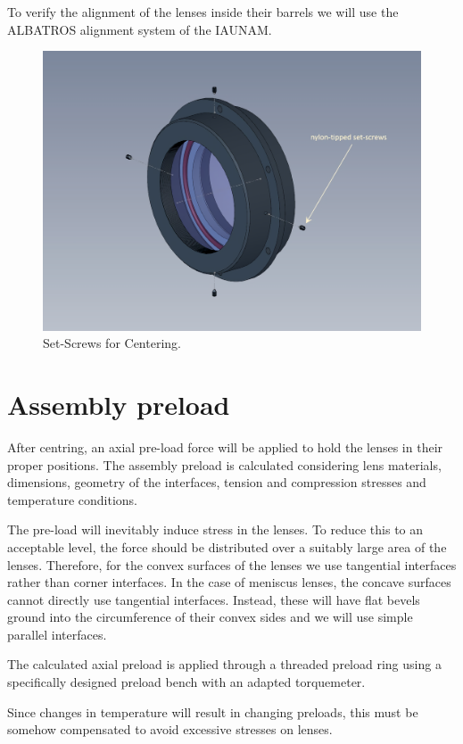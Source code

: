 \documentclass{report}
\begin{document}
To verify the alignment of the lenses inside their barrels we will use the ALBATROS alignment system of the IAUNAM.

\begin{figure}
\begin{center}
\includegraphics[width=0.7\linewidth]{figures/rosalia-set-screws.png}
\end{center}
\caption{Set-Screws for Centering.}
\label{figure:rosalia-set-screws}
\end{figure}

\section{Assembly preload}

After centring, an axial pre-load force will be applied to hold the lenses in their proper positions. The assembly preload is calculated considering lens materials, dimensions, geometry of the interfaces, tension and compression stresses and temperature conditions.

The pre-load will inevitably induce stress in the lenses. To reduce this to an acceptable level, the force should be distributed over a suitably large area of the lenses. Therefore, for the convex surfaces of the lenses we use tangential interfaces rather than corner interfaces. In the case of meniscus lenses, the concave surfaces cannot directly use tangential interfaces. Instead, these will have flat bevels ground into the circumference of their convex sides and we will use simple parallel interfaces.

The calculated axial preload is applied through a threaded preload ring using a specifically designed preload bench with an adapted torquemeter.

Since changes in temperature will result in changing preloads, this must be somehow compensated to avoid excessive stresses on lenses.
\end{document}
